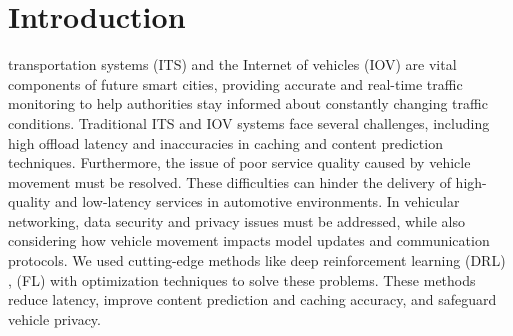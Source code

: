 \documentclass[journal]{IEEEtran}
\begin{document}
\section{Introduction}
% 
% 
% 
% 
 transportation systems (ITS) \cite{r2_its} and the Internet of vehicles (IOV) \cite{r2_iov} are vital components of future smart cities, providing accurate and real-time traffic monitoring to help authorities stay informed about constantly changing traffic conditions. Traditional ITS and IOV systems face several challenges, including high offload latency and inaccuracies in caching and content prediction techniques. Furthermore, the issue of poor service quality caused by vehicle movement must be resolved. 
These difficulties can hinder the delivery of high-quality and low-latency services in automotive environments.
In vehicular networking, data security and privacy issues must be addressed, while also considering how vehicle movement impacts model updates and communication protocols. We used cutting-edge methods like deep reinforcement learning (DRL) \cite{r2_drl}, (FL) \cite{r2_fl} with optimization techniques to solve these problems. These methods reduce latency, improve content prediction and caching accuracy, and safeguard vehicle privacy. 
\end{document}
